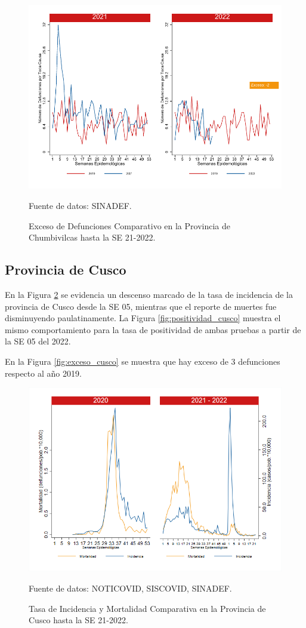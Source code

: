 \documentclass[12pt,a4paper,openany]{book}
\begin{document}
	\begin{figure}[h]
		\caption{Exceso de Defunciones Comparativo en la Provincia de Chumbivilcas hasta la SE 21-2022.}\label{fig:exceso_chumbivilcas}
		\begin{center}
			\includegraphics[width=0.7\linewidth]{../figuras/exceso_6.pdf}
		\end{center}
		{\footnotesize {Fuente de datos: SINADEF.}}
	\end{figure}
	
	\clearpage
	
	\subsection*{Provincia de Cusco}
	\noindent En la Figura \ref{fig:inc_mort_cusco} se evidencia un descenso marcado de la tasa de incidencia de la provincia de Cusco desde la SE 05, mientras que el reporte de muertes fue disminuyendo paulatinamente.   
	\noindent La  Figura \ref{fig:positividad_cusco} muestra el mismo comportamiento para la tasa de positividad de ambas pruebas a partir de la SE 05 del 2022.
	
	En la Figura \ref{fig:exceso_cusco} se muestra que hay exceso de 3 defunciones respecto al año 2019.
	
	\begin{figure}[h]
		\caption{Tasa de Incidencia y Mortalidad Comparativa en la Provincia de Cusco hasta la SE 21-2022.}\label{fig:inc_mort_cusco}
		\begin{center}
			\includegraphics[width=0.85\linewidth]{../figuras/incidencia_mortalidad_20_21_7.png}
		\end{center}
		{\footnotesize {Fuente de datos: NOTICOVID, SISCOVID, SINADEF.}}
	\end{figure}
	
\end{document}
